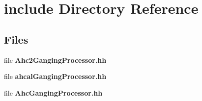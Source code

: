 \section{include Directory Reference}
\label{dir_b46d64f7d8a3ebb16a2087922067493d}
\subsection*{Files}
\begin{DoxyCompactItemize}
\item 
file {\bfseries Ahc2\-Ganging\-Processor.\-hh}
\item 
file {\bfseries ahcal\-Ganging\-Processor.\-hh}
\item 
file {\bfseries Ahc\-Ganging\-Processor.\-hh}
\end{DoxyCompactItemize}
